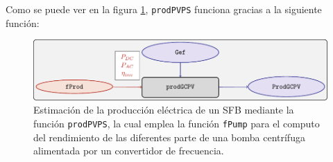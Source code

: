 Como se puede ver en la figura \ref{fig:prodpvps}, \texttt{prodPVPS} funciona gracias a la siguiente función:
\begin{figure}[]
\centering
\includegraphics[keepaspectratio,width=\textwidth,height=0.5\textheight]{figuras/prodpvps.pdf}
\caption{Estimación de la producción eléctrica de un SFB mediante la función \texttt{prodPVPS}, la cual emplea la función \texttt{fPump} para el computo del rendimiento de las diferentes parte de una bomba centrífuga alimentada por un convertidor de frecuencia. \label{fig:prodpvps}}
\end{figure}
